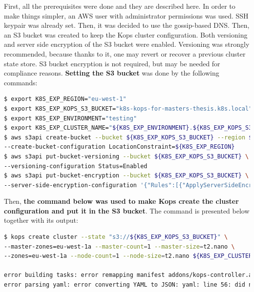 First, all the prerequisites were done and they are described here. In order to make things simpler, an AWS user with administrator permissions was used. SSH keypair was already set. Then, it was decided to use the gossip-based DNS. Then, an S3 bucket was created to keep the Kops cluster configuration. Both versioning and server side encryption of the S3 bucket were enabled. Versioning was strongly recommended, because thanks to it, one may revert or recover a previous cluster state store. S3 bucket encryption is not required, but may be needed for compliance reasons\cite{online-kops-aws}. \textbf{Setting the S3 bucket} was done by the following commands:
\begin{lstlisting}[basicstyle=\tiny,caption={Commands used to set an AWS S3 bucket for Kops},captionpos=b,language=Bash,xleftmargin=1cm]
$ export K8S_EXP_REGION="eu-west-1"
$ export K8S_EXP_KOPS_S3_BUCKET="k8s-kops-for-masters-thesis.k8s.local"
$ export K8S_EXP_ENVIRONMENT="testing"
$ export K8S_EXP_CLUSTER_NAME="${K8S_EXP_ENVIRONMENT}.${K8S_EXP_KOPS_S3_BUCKET}"
$ aws s3api create-bucket --bucket ${K8S_EXP_KOPS_S3_BUCKET} --region ${K8S_EXP_REGION} \
--create-bucket-configuration LocationConstraint=${K8S_EXP_REGION}
$ aws s3api put-bucket-versioning --bucket ${K8S_EXP_KOPS_S3_BUCKET} \
--versioning-configuration Status=Enabled
$ aws s3api put-bucket-encryption --bucket ${K8S_EXP_KOPS_S3_BUCKET} \
--server-side-encryption-configuration '{"Rules":[{"ApplyServerSideEncryptionByDefault":{"SSEAlgorithm":"AES256"}}]}'
\end{lstlisting}

Then, \textbf{the command below was used to make Kops create the cluster configuration and put it in the S3 bucket}. The command is presented below together with its output:
\begin{lstlisting}[basicstyle=\tiny,caption={Command used to make Kops create the cluster configuration and put it in the S3 bucket},captionpos=b,language=Bash,xleftmargin=1cm]
$ kops create cluster --state "s3://${K8S_EXP_KOPS_S3_BUCKET}" \
--master-zones=eu-west-1a --master-count=1 --master-size=t2.nano \
--zones=eu-west-1a --node-count=1 --node-size=t2.nano ${K8S_EXP_CLUSTER_NAME}

error building tasks: error remapping manifest addons/kops-controller.addons.k8s.io/k8s-1.16.yaml: \
error parsing yaml: error converting YAML to JSON: yaml: line 56: did not find expected alphabetic or numeric character
\end{lstlisting}

